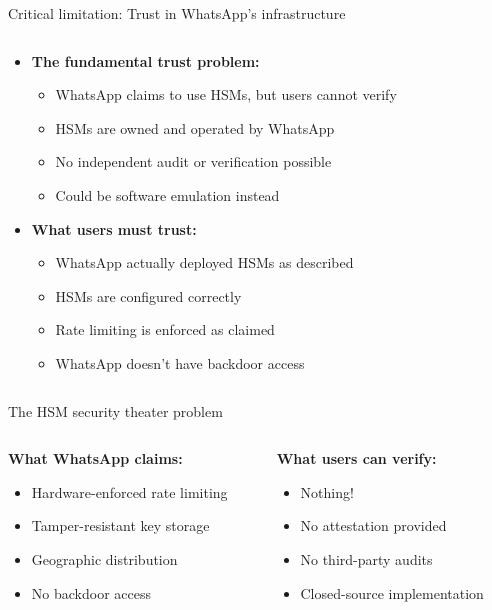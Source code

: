\documentclass[aspectratio=169, lualatex, handout]{beamer}
\begin{document}
\begin{frame}{Critical limitation: Trust in WhatsApp's infrastructure}
	\begin{columns}[c]
		\begin{column}{1\textwidth}
			\begin{itemize}
				\item \textbf{The fundamental trust problem:}
				      \begin{itemize}
					      \item WhatsApp claims to use HSMs, but users cannot verify
					      \item HSMs are owned and operated by WhatsApp
					      \item No independent audit or verification possible
					      \item Could be software emulation instead
				      \end{itemize}
				\item \textbf{What users must trust:}
				      \begin{itemize}
					      \item WhatsApp actually deployed HSMs as described
					      \item HSMs are configured correctly
					      \item Rate limiting is enforced as claimed
					      \item WhatsApp doesn't have backdoor access
				      \end{itemize}
			\end{itemize}
		\end{column}
	\end{columns}
\end{frame}

\begin{frame}{The HSM security theater problem}
	\begin{columns}[c]
		\begin{column}{0.5\textwidth}
			\textbf{What WhatsApp claims:}
			\begin{itemize}
				\item Hardware-enforced rate limiting
				\item Tamper-resistant key storage
				\item Geographic distribution
				\item No backdoor access
			\end{itemize}
		\end{column}
		\begin{column}{0.5\textwidth}
			\textbf{What users can verify:}
			\begin{itemize}
				\item Nothing!
				\item No attestation provided
				\item No third-party audits
				\item Closed-source implementation
			\end{itemize}
		\end{column}
	\end{columns}
\end{frame}
\end{document}
